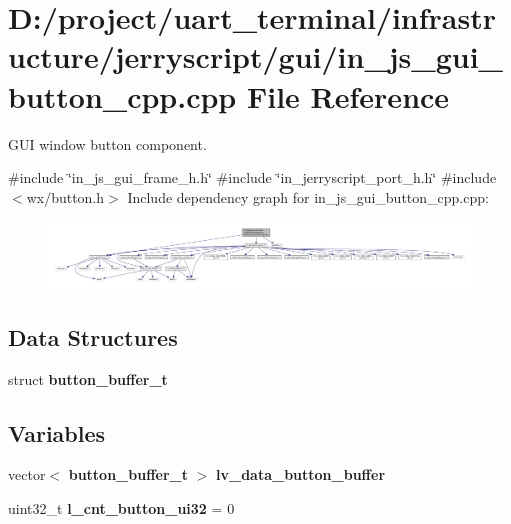 \section{D\+:/project/uart\+\_\+terminal/infrastructure/jerryscript/gui/in\+\_\+js\+\_\+gui\+\_\+button\+\_\+cpp.cpp File Reference}
\label{in__js__gui__button__cpp_8cpp}


G\+UI window button component.  


{\ttfamily \#include \char`\"{}in\+\_\+js\+\_\+gui\+\_\+frame\+\_\+h.\+h\char`\"{}}\newline
{\ttfamily \#include \char`\"{}in\+\_\+jerryscript\+\_\+port\+\_\+h.\+h\char`\"{}}\newline
{\ttfamily \#include $<$wx/button.\+h$>$}\newline
Include dependency graph for in\+\_\+js\+\_\+gui\+\_\+button\+\_\+cpp.\+cpp\+:\nopagebreak
\begin{figure}[H]
\begin{center}
\leavevmode
\includegraphics[width=350pt]{in__js__gui__button__cpp_8cpp__incl}
\end{center}
\end{figure}
\subsection*{Data Structures}
\begin{DoxyCompactItemize}
\item 
struct \textbf{ button\+\_\+buffer\+\_\+t}
\end{DoxyCompactItemize}
\subsection*{Variables}
\begin{DoxyCompactItemize}
\item 
vector$<$ \textbf{ button\+\_\+buffer\+\_\+t} $>$ \textbf{ lv\+\_\+data\+\_\+button\+\_\+buffer}
\item 
uint32\+\_\+t {\bfseries l\+\_\+cnt\+\_\+button\+\_\+ui32} = 0
\end{DoxyCompactItemize}


